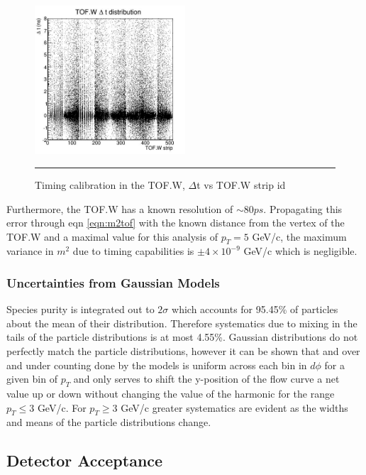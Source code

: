 \begin{figure}[htbp]
  \centering
    \includegraphics[width=0.5\textwidth]{evtQA/ttofwdist.JPG}
    \rule{35em}{0.5pt}
  \caption[Timing calibration in the TOF.W]{Timing calibration in the TOF.W, $\Delta$t vs TOF.W strip id}
  \label{fig:tofwdist}
\end{figure}

Furthermore, the TOF.W has a known resolution of $\sim 80 ps$. Propagating this error through eqn \ref{eqn:m2tof} with the known distance from the vertex of the TOF.W and a maximal value for this analysis of $p_T=5$ GeV/c, the maximum variance in $m^2$ due to timing capabilities is $\pm 4 \times 10^{-9}$ GeV/c which is negligible.

\subsubsection{Uncertainties from Gaussian Models}
Species purity is integrated out to $2\sigma$ which accounts for 95.45\% of particles about the mean of their distribution. Therefore systematics due to mixing in the tails of the particle distributions is at most 4.55\%. Gaussian distributions do not perfectly match the particle distributions, however it can be shown that and over and under counting done by the models is uniform across each bin in $d\phi$ for a given bin of $p_T$ and only serves to shift the y-position of the flow curve a net value up or down without changing the value of the harmonic for the range $p_T \leq 3$ GeV/c. For $p_T \geq 3$ GeV/c greater systematics are evident as the widths and means of the particle distributions change. 

\subsection{Detector Acceptance}




\pagebreak
\pagebreak
